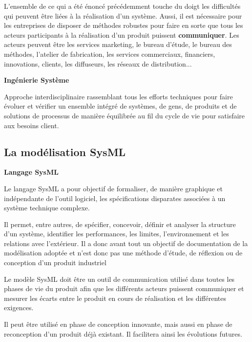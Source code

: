 \documentclass[11pt,oneside]{article}
\begin{document}
L'ensemble de ce qui a été énoncé précédemment touche du doigt les difficultés qui peuvent être liées à la réalisation d'un système. Aussi, il est nécessaire pour les entreprises de disposer de méthodes robustes pour faire en sorte que tous les acteurs participants à la réalisation d'un produit puissent \textbf{communiquer}. Les acteurs peuvent être les services marketing, le bureau d'étude, le bureau des méthodes, l'atelier de fabrication, les services commerciaux, financiers, innovations, clients, les diffuseurs, les réseaux de distribution...

\begin{defi}
\textbf{Ingénierie Système} \cite{roques}

Approche
interdisciplinaire rassemblant tous les efforts techniques pour faire évoluer et vérifier un
ensemble intégré de systèmes, de gens, de produits et de solutions de processus de
manière équilibrée au fil du cycle de vie pour satisfaire aux besoins client.

\end{defi}



\subsection{La modélisation SysML}


\begin{defi}
\textbf{Langage SysML} \cite{sii}

Le langage SysML a pour objectif de formaliser, de manière graphique et indépendante de
l’outil logiciel, les spécifications disparates associées à un système technique complexe.

Il permet, entre autres, de spécifier, concevoir, définir et analyser la structure d’un système,
identifier les performances, les limites, l’environnement et les relations avec l’extérieur. Il a
donc avant tout un objectif de documentation de la modélisation adoptée et n’est donc pas
une méthode d’étude, de réflexion ou de conception d’un produit industriel

\end{defi}


Le modèle SysML doit être un outil de communication utilisé dans toutes les phases de vie du produit afin que les différents acteurs puissent communiquer et mesurer les écarts entre le produit en cours de réalisation et les différentes exigences. 

Il peut être utilisé en phase de conception innovante, mais aussi en phase de reconception d'un produit déjà existant. Il facilitera ainsi les évolutions futures. 
\end{document}
